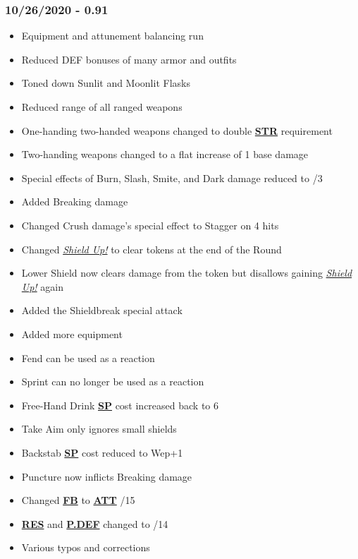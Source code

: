 \documentclass[12pt]{article}
\newcommand{\refto}[1]{\hyperlink{#1}{\textbf{#1}}}
\newcommand{\reftoit}[1]{\hyperlink{#1}{\emph{#1}}}
\begin{document}
\begin{multicols*}{2}
\subsubsection*{10/26/2020 - 0.91}
\begin{itemize}
\item Equipment and attunement balancing run
\item Reduced DEF bonuses of many armor and outfits
\item Toned down Sunlit and Moonlit Flasks
\item Reduced range of all ranged weapons
\item One-handing two-handed weapons changed to double \refto{STR} requirement
\item Two-handing weapons changed to a flat increase of 1 base damage
\item Special effects of Burn, Slash, Smite, and Dark damage reduced to /3
\item Added Breaking damage
\item Changed Crush damage’s special effect to Stagger on 4 hits
\item Changed \reftoit{Shield Up!} to clear tokens at the end of the Round
\item Lower Shield now clears damage from the token but disallows gaining \reftoit{Shield Up!} again
\item Added the Shieldbreak special attack
\item Added more equipment
\item Fend can be used as a reaction
\item Sprint can no longer be used as a reaction
\item Free-Hand Drink \refto{SP} cost increased back to 6
\item Take Aim only ignores small shields
\item Backstab \refto{SP} cost reduced to Wep+1
\item Puncture now inflicts Breaking damage
\item Changed \refto{FB} to \refto{ATT} /15
\item \refto{RES} and \refto{P.DEF} changed to /14
\item Various typos and corrections
\end{itemize}

\end{multicols*}
\end{document}
